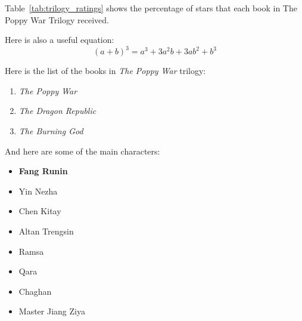 Table~\ref{tab:trilogy_ratings} shows the percentage of stars that each book in The Poppy War Trilogy received.

\begin{table}[H]
    \centering
    
\end{table}

Here is also a useful equation: \[(a+b)^3=a^3+3a^2b+3ab^2+b^3\]

Here is the list of the books in \textit{The Poppy War} trilogy:
\begin{enumerate}
    \item \textit{The Poppy War}
    \item \textit{The Dragon Republic} 
    \item \textit{The Burning God}
\end{enumerate}

And here are some of the main characters:
\begin{itemize}
    \item \textbf{Fang Runin}
    \item Yin Nezha
    \item Chen Kitay
    \item Altan Trengsin
    \item Ramsa
    \item Qara
    \item Chaghan
    \item Master Jiang Ziya
\end{itemize}


